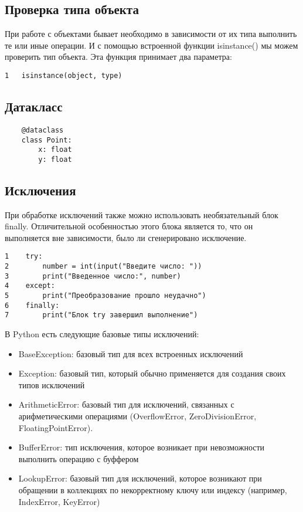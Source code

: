 \documentclass[12pt, a4paper]{article}
\begin{document}
\subsection{Проверка типа объекта}

При работе с объектами бывает необходимо в зависимости от их типа выполнить те или иные операции. И с помощью встроенной функции isinstance() мы можем проверить тип объекта. Эта функция принимает два параметра:

\begin{verbatim}	
1   isinstance(object, type)
\end{verbatim}

\subsection{Датакласс}

\begin{verbatim}
    @dataclass
    class Point:
        x: float
        y: float
\end{verbatim}

\subsection{Исключения}

При обработке исключений также можно использовать необязательный блок finally. Отличительной особенностью этого блока является то, что он выполняется вне зависимости, было ли сгенерировано исключение.

\begin{verbatim}
1    try:
2        number = int(input("Введите число: "))
3        print("Введенное число:", number)
4    except:
5        print("Преобразование прошло неудачно")
6    finally:
7        print("Блок try завершил выполнение")
\end{verbatim}

В Python есть следующие базовые типы исключений:

\begin{itemize}
    \item BaseException: базовый тип для всех встроенных исключений
    \item Exception: базовый тип, который обычно применяется для создания своих типов исключений
    \item ArithmeticError: базовый тип для исключений, связанных с арифметическими операциями (OverflowError, ZeroDivisionError, FloatingPointError).
    \item BufferError: тип исключения, которое возникает при невозможности выполнить операцию с буффером
    \item LookupError: базовый тип для исключений, которое возникают при обращении в коллекциях по некорректному ключу или индексу (например, IndexError, KeyError)
\end{itemize}
\end{document}
